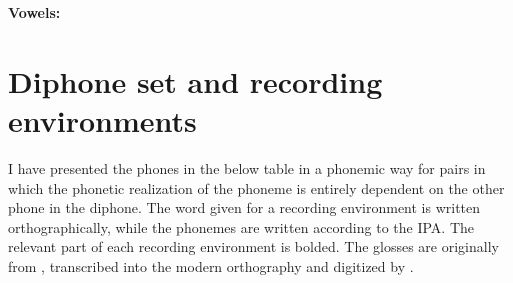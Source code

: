 \documentclass[12pt]{article}
\begin{document}
\begin{table*}[h]
\begin{threeparttable}
\begin{tabular}{|l|cc|cc|cc|cc|cc|cc|cc|cc|}
		\hline
		\end{tabular}
		\end{threeparttable}
		\end{table*}
		\noindent \textbf{Vowels:} \par
		\begin{vowel}
		\end{vowel}\par

\newpage

\section{Diphone set and recording environments}

	I have presented the phones in the below table in a phonemic way for pairs in which the phonetic realization of the phoneme is entirely dependent on the other phone in the diphone. The word given for a recording environment is written orthographically, while the phonemes are written according to the IPA. The relevant part of each recording environment is bolded. The glosses are originally from \citet{west_dict}, transcribed into the modern orthography and digitized by \citet{gov}. \par
\end{document}
